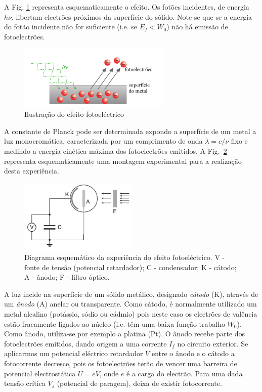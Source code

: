 \documentclass[12pt,a4paper,oneside]{paper}
\begin{document}
A Fig. \ref{fig:pe-effect} representa esquematicamente o efeito. Os fotões incidentes, de energia $h\nu$, libertam electrões
próximos da superfície do sólido. Note-se que se a energia do fotão incidente não for suficiente (i.e. se $E_f < W_0$) não
há emissão de fotoelectrões.

\begin{figure}[htb] 
	\centering 
	\includegraphics[width=0.65\textwidth]{./planck_images/pe-effect.pdf}
	\caption{Ilustração do efeito fotoeléctrico} \label{fig:pe-effect}
\end{figure}

A constante de Planck pode ser determinada expondo a superfície de um metal a luz monocromática, caracterizada por um
comprimento de onda $\lambda=c /\nu$ fixo e medindo a energia cinética máxima dos fotoelectrões emitidos. A Fig.~\ref{fig:plack_exp}
representa esquematicamente uma montagem experimental para a realização desta experiência.

\begin{figure}[htb] 
	\centering 
	\includegraphics[width=0.5\textwidth]{./planck_images/planck_exp.pdf}
	\caption{Diagrama esquemático da experiência do efeito fotoeléctrico. V - fonte de tensão (potencial retardador);
	C - condensador; K - cátodo; A - ânodo; F - filtro óptico.} \label{fig:plack_exp}
\end{figure}
A luz incide na superfície de um sólido metálico, designado \emph{cátodo} (K), através de um \emph{ânodo} (A) anelar ou transparente. 
Como cátodo, é normalmente utilizado um metal alcalino (potássio, sódio ou cádmio)  pois neste caso os electrões de valência estão
fracamente 
ligados ao núcleo (i.e. têm uma baixa função trabalho $W_0$). Como ânodo, utiliza-se por exemplo a platina (Pt). 
O ânodo recebe parte dos fotoelectrões emitidos, dando origem a uma corrente $I_f$ no circuito exterior. 
Se aplicarmos um potencial eléctrico retardador $V$ entre o ânodo e o cátodo a fotocorrente decresce, pois os fotoelectrões
terão de vencer uma barreira de potencial electrostática $U=e V$, onde $e$ é a carga do electrão. 
Para uma dada tensão crítica $V_s$ (potencial de paragem), deixa de existir fotocorrente. 
\end{document}
